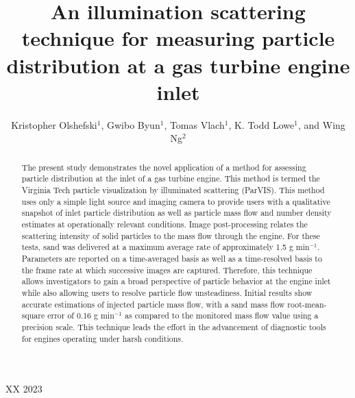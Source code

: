 \documentclass[12pt]{iopart}
\begin{document}
\title[]{An illumination scattering technique for measuring particle distribution at a gas turbine engine inlet}

\author{Kristopher Olshefski$^1$, Gwibo Byun$^1$, Tomas Vlach$^1$, K. Todd Lowe$^1$, and Wing Ng$^2$}

\address{$^1$ Crofton Department of Aerospace and Ocean Engineering, Blacksburg, VA, USA}
\address{$^2$ Department of Mechanical Engineering, Blacksburg, VA, USA}
\vspace{10pt}
\begin{indented}
\item[]XX 2023
\end{indented}

\begin{abstract}
The present study demonstrates the novel application of a method for assessing particle distribution at the inlet of a gas turbine engine. This method is termed the Virginia Tech particle visualization by illuminated scattering (ParVIS). This method uses only a simple light source and imaging camera to provide users with a qualitative snapshot of inlet particle distribution as well as particle mass flow and number density estimates at operationally relevant conditions. Image post-processing relates the scattering intensity of solid particles to the mass flow through the engine. For these tests, sand was delivered at a maximum average rate of approximately 1.5 g min$^{-1}$. Parameters are reported on a time-averaged basis as well as a time-resolved basis to the frame rate at which successive images are captured. Therefore, this technique allows investigators to gain a broad perspective of particle behavior at the engine inlet while also allowing users to resolve particle flow unsteadiness. Initial results show accurate estimations of injected particle mass flow, with a sand mass flow root-mean-square error of 0.16 g min$^{-1}$ as compared to the monitored mass flow value using a precision scale. This technique leads the effort in the advancement of diagnostic tools for engines operating under harsh conditions. 
\end{abstract}

%
%
%
% 
\ioptwocol
%
\end{document}
